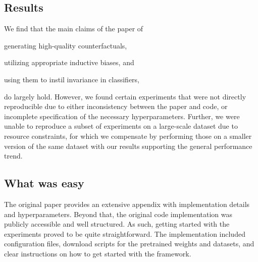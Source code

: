 \subsection*{Results}

We find that the main claims of the paper of
\begin{enumerate*}[(i)]
    \item generating high-quality counterfactuals,
    \item utilizing appropriate inductive biases, and
    \item using them to instil invariance in classifiers,
\end{enumerate*}
do largely hold.
However, we found certain experiments that were not directly reproducible due to either inconsistency between the paper and code, or incomplete specification of the necessary hyperparameters. Further, we were unable to reproduce a subset of experiments on a large-scale dataset due to resource constraints, for which we compensate by performing those on a smaller version of the same dataset with our results supporting the general performance trend.


\subsection*{What was easy}
The original paper provides an extensive appendix with implementation details and hyperparameters. Beyond that, the original code implementation was publicly accessible and well structured. As such, getting started with the experiments proved to be quite straightforward. The implementation included configuration files, download scripts for the pretrained weights and datasets, and clear instructions on how to get started with the framework.

